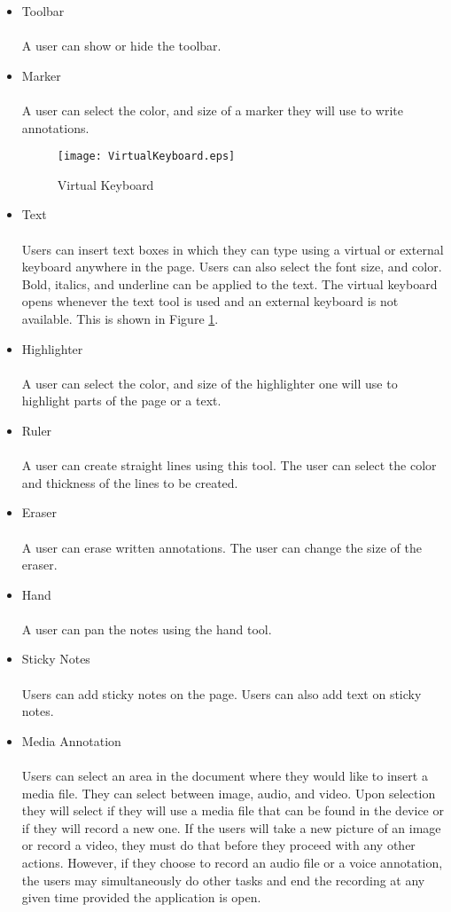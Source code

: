 \begin{itemize}
\item Toolbar
\\\\A user can show or hide the toolbar.
\item Marker
\\\\A user can select the color, and size of a marker they will use to write annotations.

\begin{figure}[htbp!]
   \centering    
   \texttt{[image: VirtualKeyboard.eps]}
   \caption{Virtual Keyboard}
   \label{fig:virtualkeyboard}
\end{figure}

\item Text
\\\\Users can insert text boxes in which they can type using a virtual or external keyboard anywhere in the page. Users can also select the font size, and color. Bold, italics, and underline can be applied to the text. The virtual keyboard opens whenever the text tool is used and an external keyboard is not available. This is shown in Figure \ref{fig:virtualkeyboard}.
\item Highlighter
\\\\A user can select the color, and size of the highlighter one will use to highlight parts of the page or a text.
\item Ruler
\\\\A user can create straight lines using this tool. The user can select the color and thickness of the lines to be created.
\item Eraser
\\\\A user can erase written annotations. The user can change the size of the eraser.
\item Hand
\\\\A user can pan the notes using the hand tool.
\item Sticky Notes
\\\\Users can add sticky notes on the page. Users can also add text on sticky notes.
\item Media Annotation
\\\\Users can select an area in the document where they would like to insert a media file. They can select between image, audio, and video. Upon selection they will select if they will use a media file that can be found in the device or if they will record a new one. If the users will take a new picture of an image or record a video, they must do that before they proceed with any other actions. However, if they choose to record an audio file or a voice annotation, the users may simultaneously do other tasks and end the recording at any given time provided the application is open.


\end{itemize}
